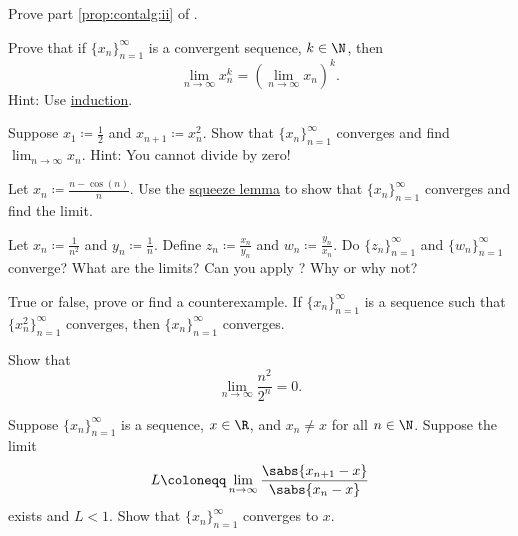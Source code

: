 \begin{exercise}
Prove part \ref{prop:contalg:ii} of .
\end{exercise}

\begin{exercise}
Prove that if $\{ x_n \}_{n=1}^\infty$ is a convergent sequence, $k \in \N$, then
\begin{equation*}
\lim_{n\to\infty} x_n^k = 
{\left( \lim_{n\to\infty} x_n \right)}^k .
\end{equation*}
Hint: Use \hyperref[induction:thm]{induction}.
\end{exercise}

\begin{exercise}
Suppose $x_1 \coloneqq \frac{1}{2}$ and $x_{n+1} \coloneqq x_n^2$.  Show that
$\{ x_n \}_{n=1}^\infty$ converges and find
$\lim_{n\to\infty} x_n$.  Hint: You cannot divide by zero!
\end{exercise}

\begin{exercise}
Let $x_n \coloneqq \frac{n-\cos(n)}{n}$.  Use the
\hyperref[squeeze:lemma]{squeeze lemma} to show that
$\{ x_n \}_{n=1}^\infty$ converges and find the limit.
\end{exercise}

\begin{exercise}
Let $x_n \coloneqq \frac{1}{n^2}$ and $y_n \coloneqq \frac{1}{n}$.  Define
$z_n \coloneqq \frac{x_n}{y_n}$ and 
$w_n \coloneqq \frac{y_n}{x_n}$.  Do $\{ z_n \}_{n=1}^\infty$ and $\{ w_n \}_{n=1}^\infty$
converge?  What are the limits?  Can you apply ?
Why or why not?
\end{exercise}

\begin{exercise}
True or false, prove or find a counterexample.  If $\{ x_n \}_{n=1}^\infty$ is a sequence
such that $\{ x_n^2 \}_{n=1}^\infty$ converges, then $\{ x_n \}_{n=1}^\infty$ converges.
\end{exercise}

\begin{exercise}
Show that
\begin{equation*}
\lim_{n\to\infty} \frac{n^2}{2^n} = 0 .
\end{equation*}
\end{exercise}

\begin{exercise}
Suppose $\{ x_n \}_{n=1}^\infty$ is a sequence, $x \in \R$, and $x_n \not= x$ for
all $n \in \N$.  Suppose the limit
\begin{equation*}
L \coloneqq \lim_{n \to \infty} \frac{\sabs{x_{n+1}-x}}{\sabs{x_n-x}}
\end{equation*}
exists and $L < 1$.  Show that $\{ x_n \}_{n=1}^\infty$ converges to $x$.
\end{exercise}

